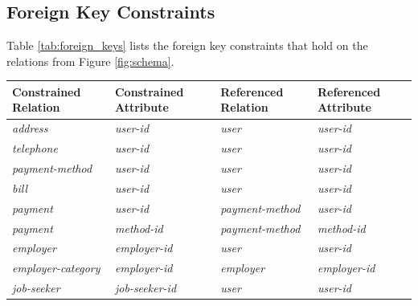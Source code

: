 \documentclass{article}
\begin{document}
        \subsection{Foreign Key Constraints}
            Table \ref{tab:foreign_keys} lists the foreign key constraints that hold on the relations from Figure
            \ref{fig:schema}.
            \begin{table}[h]
                \centering
                \begin{tabular}{|l|l|l|l|}
                    \hline
                    \textbf{Constrained Relation} & \textbf{Constrained Attribute}         & \textbf{Referenced Relation} & \textbf{Referenced Attribute}          \\ \hline
                    \textit{address}              & \textit{user-id}                       & \textit{user}                & \textit{user-id}                       \\ \hline
                    \textit{telephone}            & \textit{user-id}                       & \textit{user}                & \textit{user-id}                       \\ \hline
                    \textit{payment-method}       & \textit{user-id}                       & \textit{user}                & \textit{user-id}                       \\ \hline
                    \textit{bill}                 & \textit{user-id}                       & \textit{user}                & \textit{user-id}                       \\ \hline
                    \textit{payment}              & \textit{user-id}                       & \textit{payment-method}      & \textit{user-id}                       \\ \hline
                    \textit{payment}              & \textit{method-id}                     & \textit{payment-method}      & \textit{method-id}                     \\ \hline
                    \textit{employer}             & \textit{employer-id}                   & \textit{user}                & \textit{user-id}                       \\ \hline
                    \textit{employer-category}    & \textit{employer-id}                   & \textit{employer}            & \textit{employer-id}                   \\ \hline
                    \textit{job-seeker}           & \textit{job-seeker-id}                 & \textit{user}                & \textit{user-id}                       \\ \hline

\end{tabular}
\end{table}
\end{document}
